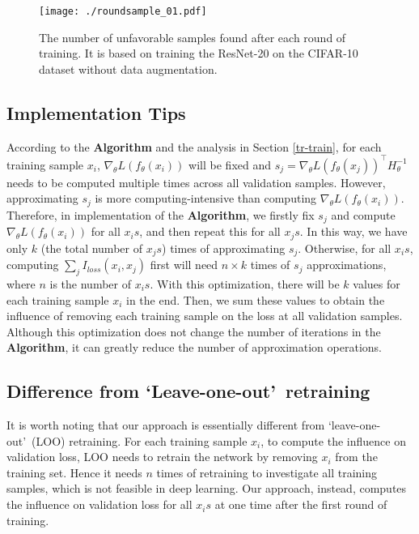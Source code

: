 \documentclass[10pt, conference, letterpaper]{IEEEtran}
\begin{document}
\begin{figure}
    \centering
    \texttt{[image: ./roundsample\_01.pdf]}
    \caption{The number of unfavorable samples found after each round of training. It is based on training the ResNet-20 \cite{he2016deep} on the CIFAR-10 dataset without data augmentation.}
    \label{roundsample}
\end{figure}


\subsection{Implementation Tips}
\label{impldetail}
According to the \textbf{Algorithm} and the analysis in Section \ref{tr-train}, for each training sample $x_{i}$, $\nabla_\theta L(f_{\theta}(x_{i}))$ will be fixed and $s_{j}=\nabla_\theta L(f_{\theta}(x_{j}))^\top H_{\theta}^{-1}$ needs to be computed multiple times across all validation samples. However, approximating $s_{j}$ is more computing-intensive than computing $\nabla_\theta L(f_{\theta}(x_{i}))$. Therefore, in implementation of the \textbf{Algorithm}, we firstly fix $s_{j}$ and compute $\nabla_\theta L(f_{\theta}(x_{i}))$ for all $x_{i}s$, and then repeat this for all $x_{j}s$. In this way, we have only $k$ (the total number of $x_{j}s$) times of approximating $s_{j}$. Otherwise, for all $x_{i}s$, computing $\sum_{j}I_{loss}(x_{i}, x_{j})$ first will need $n \times k$ times of $s_{j}$ approximations, where $n$ is the number of $x_{i}s$. With this optimization, there will be $k$ values for each training sample $x_{i}$ in the end. Then, we sum these values to obtain the influence of removing each training sample on the loss at all validation samples. Although this optimization does not change the number of iterations in the \textbf{Algorithm}, it can greatly reduce the number of approximation operations.


\subsection{Difference from \textquoteleft Leave-one-out\textquoteright ~retraining}
It is worth noting that our approach is essentially different from \textquoteleft leave-one-out\textquoteright ~(LOO) retraining. For each training sample $x_{i}$, to compute the influence on validation loss, LOO needs to retrain the network by removing $x_{i}$ from the training set. Hence it needs $n$ times of retraining to investigate all training samples, which is not feasible in deep learning. Our approach, instead, computes the influence on validation loss for all $x_{i}s$ at one time after the first round of training.
\end{document}
